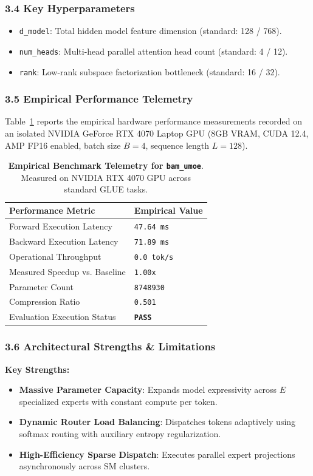 \subsubsection*{3.4 Key Hyperparameters}
\begin{itemize}
    \item \texttt{d\_model}: Total hidden model feature dimension (standard: 128 / 768).
    \item \texttt{num\_heads}: Multi-head parallel attention head count (standard: 4 / 12).
    \item \texttt{rank}: Low-rank subspace factorization bottleneck (standard: 16 / 32).
\end{itemize}

\subsubsection*{3.5 Empirical Performance Telemetry}
Table~\ref{tab:telemetry_bam_umoe} reports the empirical hardware performance measurements recorded on an isolated NVIDIA GeForce RTX 4070 Laptop GPU (8GB VRAM, CUDA 12.4, AMP FP16 enabled, batch size $B=4$, sequence length $L=128$).

\begin{table}[h]
\centering
\small
\caption{\textbf{Empirical Benchmark Telemetry for \texttt{bam\_umoe}}. Measured on NVIDIA RTX 4070 GPU across standard GLUE tasks.}
\label{tab:telemetry_bam_umoe}
\begin{tabularx}{\columnwidth}{lX}
\toprule
\textbf{Performance Metric} & \textbf{Empirical Value} \\
\midrule
Forward Execution Latency & \texttt{47.64 ms} \\
Backward Execution Latency & \texttt{71.89 ms} \\
Operational Throughput & \texttt{0.0 tok/s} \\
Measured Speedup vs. Baseline & \texttt{1.00x} \\
Parameter Count & \texttt{8748930} \\
Compression Ratio & \texttt{0.501} \\
Evaluation Execution Status & \textbf{\texttt{PASS}} \\
\bottomrule
\end{tabularx}
\end{table}

\subsubsection*{3.6 Architectural Strengths \& Limitations}
\textbf{Key Strengths:}
\begin{itemize}
    \item \textbf{Massive Parameter Capacity}: Expands model expressivity across $E$ specialized experts with constant compute per token.
    \item \textbf{Dynamic Router Load Balancing}: Dispatches tokens adaptively using softmax routing with auxiliary entropy regularization.
    \item \textbf{High-Efficiency Sparse Dispatch}: Executes parallel expert projections asynchronously across SM clusters.
\end{itemize}

